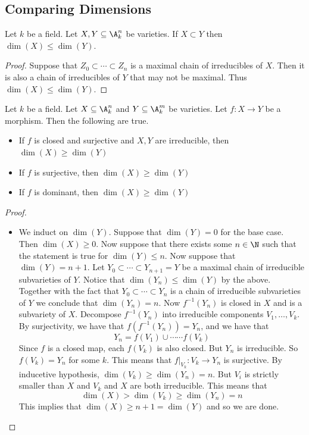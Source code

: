 \documentclass[a4paper]{article}
\begin{document}
\subsection{Comparing Dimensions}
\begin{lmm}{}{} Let $k$ be a field. Let $X,Y\subseteq\A_k^n$ be varieties. If $X\subset Y$ then $\dim(X)\leq\dim(Y)$. 
\begin{proof}
Suppose that $Z_0\subset\cdots\subset Z_n$ is a maximal chain of irreducibles of $X$. Then it is also a chain of irreducibles of $Y$ that may not be maximal. Thus $\dim(X)\leq\dim(Y)$. 
\end{proof}
\end{lmm}

\begin{prp}{}{} Let $k$ be a field. Let $X\subseteq\A_k^n$ and $Y\subseteq\A_k^m$ be varieties. Let $f:X\to Y$ be a morphism. Then the following are true. 
\begin{itemize}
\item If $f$ is closed and surjective and $X,Y$ are irreducible, then $\dim(X)\geq\dim(Y)$
\item If $f$ is surjective, then $\dim(X)\geq\dim(Y)$
\item If $f$ is dominant, then $\dim(X)\geq\dim(Y)$
\end{itemize} 
\begin{proof}~\\
\begin{itemize}
\item We induct on $\dim(Y)$. Suppose that $\dim(Y)=0$ for the base case. Then $\dim(X)\geq 0$. Now suppose that there exists some $n\in\N$ such that the statement is true for $\dim(Y)\leq n$. Now suppose that $\dim(Y)=n+1$. Let $Y_0\subset\cdots\subset Y_{n+1}=Y$ be a maximal chain of irreducible subvarieties of $Y$. Notice that $\dim(Y_n)\leq\dim(Y)$ by the above. Together with the fact that $Y_0\subset\cdots\subset Y_n$ is a chain of irreducible subvarieties of $Y$ we conclude that $\dim(Y_n)=n$. Now $f^{-1}(Y_n)$ is closed in $X$ and is a subvariety of $X$. Decompose $f^{-1}(Y_n)$ into irreducible components $V_1,\dots,V_k$. By surjectivity, we have that $f(f^{-1}(Y_n))=Y_n$, and we have that $$Y_n=f(V_1)\cup\cdots\cdots f(V_k)$$ Since $f$ is a closed map, each $f(V_k)$ is also closed. But $Y_n$ is irreducible. So $f(V_k)=Y_n$ for some $k$. This means that $f|_{V_k}:V_k\to Y_n$ is surjective. By inducetive hypothesis, $\dim(V_k)\geq\dim(Y_n)=n$. But $V_i$ is strictly smaller than $X$ and $V_k$ and $X$ are both irreducible. This means that $$\dim(X)>\dim(V_k)\geq\dim(Y_n)=n$$ This implies that $\dim(X)\geq n+1=\dim(Y)$ and so we are done. 
\end{itemize}
\end{proof}
\end{prp}
\end{document}
